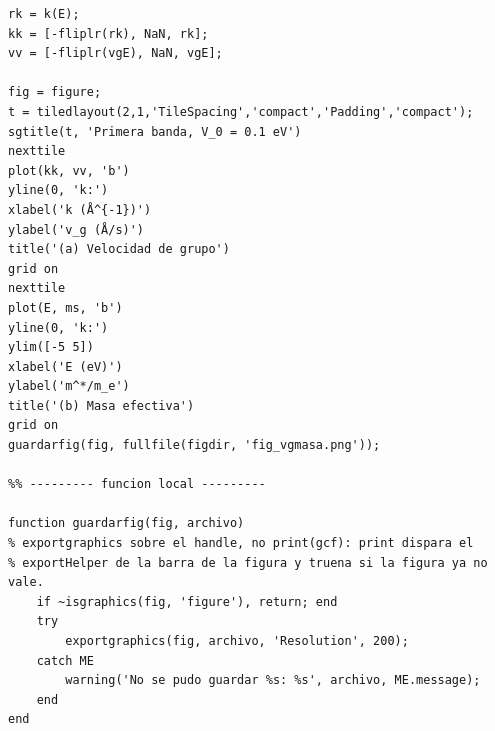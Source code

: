 \documentclass[hidelinks]{article}
\begin{document}
\begin{lstlisting}
rk = k(E);
kk = [-fliplr(rk), NaN, rk];
vv = [-fliplr(vgE), NaN, vgE];

fig = figure;
t = tiledlayout(2,1,'TileSpacing','compact','Padding','compact');
sgtitle(t, 'Primera banda, V_0 = 0.1 eV')
nexttile
plot(kk, vv, 'b')
yline(0, 'k:')
xlabel('k (Å^{-1})')
ylabel('v_g (Å/s)')
title('(a) Velocidad de grupo')
grid on
nexttile
plot(E, ms, 'b')
yline(0, 'k:')
ylim([-5 5])
xlabel('E (eV)')
ylabel('m^*/m_e')
title('(b) Masa efectiva')
grid on
guardarfig(fig, fullfile(figdir, 'fig_vgmasa.png'));

%% --------- funcion local ---------

function guardarfig(fig, archivo)
% exportgraphics sobre el handle, no print(gcf): print dispara el
% exportHelper de la barra de la figura y truena si la figura ya no vale.
    if ~isgraphics(fig, 'figure'), return; end
    try
        exportgraphics(fig, archivo, 'Resolution', 200);
    catch ME
        warning('No se pudo guardar %s: %s', archivo, ME.message);
    end
end
\end{lstlisting}
\end{document}

